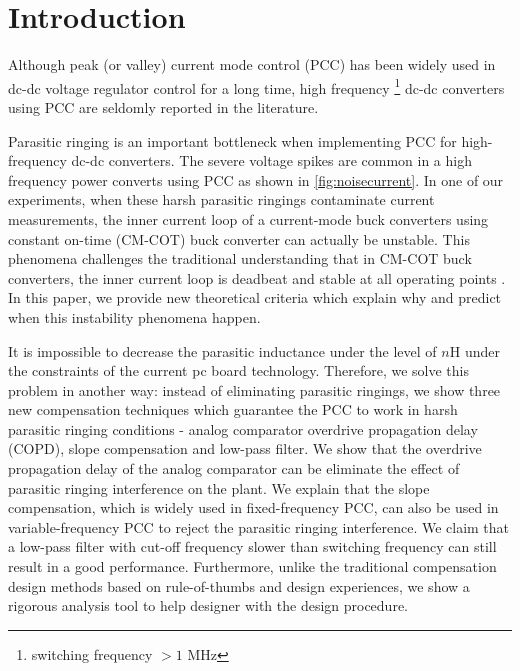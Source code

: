 \section{Introduction}\label{sec:Intro}
Although peak (or valley) current mode control (PCC) has been widely used in dc-dc voltage regulator control for a long time, high frequency \footnote{switching frequency $> 1$ MHz} dc-dc converters using PCC are seldomly reported in the literature.

Parasitic ringing is an important bottleneck when implementing PCC for high-frequency dc-dc converters. The severe voltage spikes are common in a high frequency power converts using PCC as shown in \ref{fig:noisecurrent}. In one of our experiments, when these harsh parasitic ringings contaminate current measurements, the inner current loop of a current-mode buck converters using constant on-time (CM-COT) buck converter can actually be unstable. This phenomena challenges the traditional understanding that in CM-COT buck converters, {\color{red} the inner current loop} is deadbeat and stable at all operating points \cite{Redl1981}. In this paper, we provide new theoretical criteria which explain why and predict when this instability phenomena happen.

It is impossible to decrease the parasitic inductance under the level of $n$H under the constraints of the current pc board technology. Therefore, we solve this problem in another way: instead of eliminating parasitic ringings, we show three new compensation techniques which guarantee the PCC to work in harsh parasitic ringing conditions - analog comparator overdrive propagation delay {\color{red}(COPD)}, slope compensation and low-pass filter. We show that the overdrive propagation delay of the analog comparator can be eliminate the effect of parasitic ringing interference on the plant. We explain that the slope compensation, which is widely used in fixed-frequency PCC, can also be used in variable-frequency PCC to reject the parasitic ringing interference. We claim that a low-pass filter with cut-off frequency slower than switching frequency can still result in a good performance.
Furthermore, unlike the traditional compensation design methods based on rule-of-thumbs and design experiences, we show a rigorous analysis tool to help designer with the design procedure.


